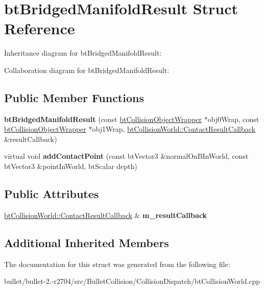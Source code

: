 \hypertarget{structbt_bridged_manifold_result}{\section{bt\+Bridged\+Manifold\+Result Struct Reference}
\label{structbt_bridged_manifold_result}
}


Inheritance diagram for bt\+Bridged\+Manifold\+Result\+:


Collaboration diagram for bt\+Bridged\+Manifold\+Result\+:
\subsection*{Public Member Functions}
\begin{DoxyCompactItemize}
\item 
\hypertarget{structbt_bridged_manifold_result_aa9f9786341735dd00f3c61f623885818}{{\bfseries bt\+Bridged\+Manifold\+Result} (const \hyperlink{structbt_collision_object_wrapper}{bt\+Collision\+Object\+Wrapper} $\ast$obj0\+Wrap, const \hyperlink{structbt_collision_object_wrapper}{bt\+Collision\+Object\+Wrapper} $\ast$obj1\+Wrap, \hyperlink{structbt_collision_world_1_1_contact_result_callback}{bt\+Collision\+World\+::\+Contact\+Result\+Callback} \&result\+Callback)}\label{structbt_bridged_manifold_result_aa9f9786341735dd00f3c61f623885818}

\item 
\hypertarget{structbt_bridged_manifold_result_a9eb7dd871adfe2f4b6fc04f8687c88c1}{virtual void {\bfseries add\+Contact\+Point} (const bt\+Vector3 \&normal\+On\+B\+In\+World, const bt\+Vector3 \&point\+In\+World, bt\+Scalar depth)}\label{structbt_bridged_manifold_result_a9eb7dd871adfe2f4b6fc04f8687c88c1}

\end{DoxyCompactItemize}
\subsection*{Public Attributes}
\begin{DoxyCompactItemize}
\item 
\hypertarget{structbt_bridged_manifold_result_a50e4e29bc74ce91098590fa68ebc8c98}{\hyperlink{structbt_collision_world_1_1_contact_result_callback}{bt\+Collision\+World\+::\+Contact\+Result\+Callback} \& {\bfseries m\+\_\+result\+Callback}}\label{structbt_bridged_manifold_result_a50e4e29bc74ce91098590fa68ebc8c98}

\end{DoxyCompactItemize}
\subsection*{Additional Inherited Members}


The documentation for this struct was generated from the following file\+:\begin{DoxyCompactItemize}
\item 
bullet/bullet-\/2.-\/r2704/src/\+Bullet\+Collision/\+Collision\+Dispatch/bt\+Collision\+World.\+cpp\end{DoxyCompactItemize}
